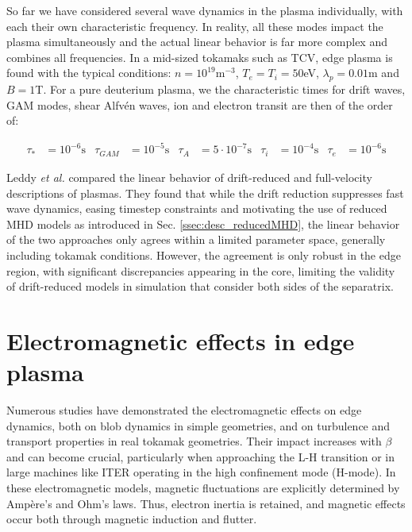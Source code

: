 So far we have considered several wave dynamics in the plasma individually, with each their own characteristic frequency. In reality, all these modes impact the plasma simultaneously and the actual linear behavior is far more complex and combines all frequencies. In a mid-sized tokamaks such as TCV, edge plasma is found with the typical conditions: $n=10^{19}$m$^{-3}$, $T_e=T_i=50$eV, $\lambda_p=0.01$m and $B=1$T. For a pure deuterium plasma, we the characteristic times for drift waves, GAM modes, shear Alfvén waves, ion and electron transit are then of the order of:
 
\begin{align}
	\label{eq:desc_typicalTimes}
	\tau_* &= 10^{-6}\text{s} & \tau_{GAM} &= 10^{-5}\text{s} & \tau_A &=  5\cdot10^{-7}\text{s} & \tau_i &=  10^{-4}\text{s} & \tau_e &=  10^{-6}\text{s}  
\end{align}


Leddy \emph{et al.}\cite{leddy2015validity} compared the linear behavior of drift-reduced and full-velocity descriptions of plasmas. They found that while the drift reduction suppresses fast wave dynamics, easing timestep constraints and motivating the use of reduced MHD models as introduced in Sec. \ref{ssec:desc_reducedMHD}, the linear behavior of the two approaches only agrees within a limited parameter space, generally including tokamak conditions. However, the agreement is only robust in the edge region, with significant discrepancies appearing in the core, limiting the validity of drift-reduced models in simulation that consider both sides of the separatrix.




\section{Electromagnetic effects in edge plasma}
\label{sec:edge_EMeffects}

Numerous studies have demonstrated the electromagnetic effects on edge dynamics, both on blob dynamics in simple geometries\cite{lee2015, Stepanenko_2020}, and on turbulence and transport properties in real tokamak geometries\cite{zhu2023, zholobenko_2024}. Their impact increases with $\beta$ and can become crucial, particularly when approaching the L-H transition or in large machines like ITER operating in the high confinement mode (H-mode)\cite{zholobenko_2024}. In these electromagnetic models, magnetic fluctuations are explicitly determined by Ampère's and Ohm’s laws\cite{DUDSON_2009, Ricci_2012, dudson2015, stegmeir2019, giacomin2022gbs, zhang2024}. Thus, electron inertia is retained, and magnetic effects occur both through magnetic induction and flutter. 

